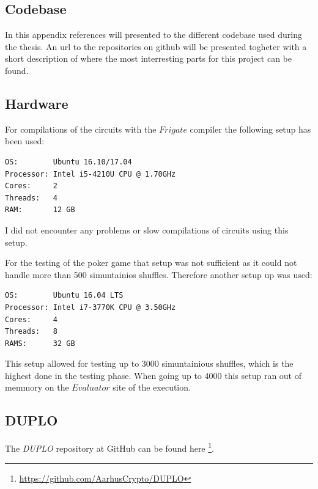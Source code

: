 \documentclass[twoside,11pt,openright]{report}
\newcommand{\DUPLO}{\textit{DUPLO} }
\begin{document}

\begin{appendices}
\chapter{Codebase}
In this appendix references will presented to the different codebase used during the thesis. An url to the repositories on github will be presented togheter with a short description of where the most interresting parts for this project can be found.

\section{Hardware}
\label{app:hardware}
For compilations of the circuits with the $Frigate$ compiler the following setup has been used:

\begin{center}
\begin{verbatim}
OS:        Ubuntu 16.10/17.04
Processor: Intel i5-4210U CPU @ 1.70GHz
Cores:     2
Threads:   4
RAM:       12 GB
\end{verbatim}
\end{center}

I did not encounter any problems or slow compilations of circuits using this setup.

\bigskip
For the testing of the poker game that setup was not sufficient as it could not handle more than 500 simuntainios shuffles. Therefore another setup up was used:

\begin{center}
\begin{verbatim}
OS:        Ubuntu 16.04 LTS
Processor: Intel i7-3770K CPU @ 3.50GHz
Cores:     4
Threads:   8
RAMS:      32 GB
\end{verbatim}
\end{center}

This setup allowed for testing up to 3000 simuntainious shuffles, which is the highest done in the testing phase. When going up to 4000 this setup ran out of memmory on the $Evaluator$ site of the execution.


\section{DUPLO}
\label{app:duplo}
The \DUPLO repository at GitHub can be found here \footnote{\url{https://github.com/AarhusCrypto/DUPLO}}.


\end{appendices}
\end{document}
